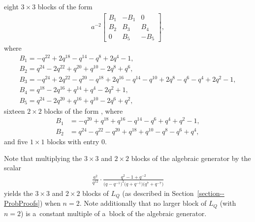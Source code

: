 \documentclass[10pt,a4paper]{amsart}
\numberwithin{equation}{section}
\theoremstyle{definition}
\newcommand{\flac}[2]{#1}
\begin{document}
eight $3 \times 3$ blocks of the form
\begin{align*}
 a^{-2} \begin{bmatrix}
 B_1 & -B_1 & 0 \\
 B_2 & B_3 & B_4 \\
 0 & B_5 & -B_5
 \end{bmatrix},
\end{align*}
where
\begin{gather*}
 B_1 = -\flac{q^{22}}{a^2}+\flac{2q^{18}}{a^2}-\flac{q^{14}}{a^2}-\flac{q^{8}}{a^2}+\flac{2q^{4}}{a^2}-\flac{1}{a^2}, \\
 B_2 = \flac{q^{24}}{a^2}-\flac{2q^{22}}{a^2}+\flac{q^{20}}{a^2}+\flac{q^{10}}{a^2}-\flac{2q^{8}}{a^2}+\flac{q^{6}}{a^2}, \\
 B_3 = -\flac{q^{24}}{a^2}+\flac{2q^{22}}{a^2}-\flac{q^{20}}{a^2}-\flac{q^{18}}{a^2}+\flac{2q^{16}}{a^2}-\flac{q^{14}}{a^2}-\flac{q^{10}}{a^2}+\flac{2q^{8}}{a^2}-\flac{q^{6}}{a^2}-\flac{q^{4}}{a^2}+\flac{2q^{2}}{a^2}-\flac{1}{a^2}, \\
 B_4 = \flac{q^{18}}{a^2}-\flac{2q^{16}}{a^2}+\flac{q^{14}}{a^2}+\flac{q^{4}}{a^2}-\flac{2q^{2}}{a^2}+\flac{1}{a^2}, \\
 B_5 = \flac{q^{24}}{a^2}-\flac{2q^{20}}{a^2}+\flac{q^{16}}{a^2}+\flac{q^{10}}{a^2}-\flac{2q^{6}}{a^2}+\flac{q^{2}}{a^2},
\end{gather*}
sixteen $2 \times 2$ blocks of the form
,
where
\begin{align*}
 B_1 &= -\flac{q^{20}}{a^2}+\flac{q^{18}}{a^2}+\flac{q^{16}}{a^2}-\flac{q^{14}}{a^2}-\flac{q^{6}}{a^2}+\flac{q^{4}}{a^2}+\flac{q^{2}}{a^2}-\flac{1}{a^2}, \\
 B_2 &= \flac{q^{24}}{a^2}-\flac{q^{22}}{a^2}-\flac{q^{20}}{a^2}+\flac{q^{18}}{a^2}+\flac{q^{10}}{a^2}-\flac{q^{8}}{a^2}-\flac{q^{6}}{a^2}+\flac{q^{4}}{a^2},
\end{align*}
and five $1 \times 1$ blocks with entry $0$.

Note that multiplying the $3 \times 3$ and $2 \times 2$ blocks of the algebraic generator by the scalar
\begin{align*}
 \frac{a^2}{q^{12}} \cdot \frac{q^2-1+q^{-2}}{\bigl(q-q^{-1}\bigr)^2 \bigl(q+q^{-1}\bigr) \bigl(q^7+q^{-7}\bigr)}
\end{align*}
yields the $3 \times 3$ and $2 \times 2$ blocks of $L_Q$ (as described in Section~\ref{section--ProbProofs}) when $n=2$. Note additionally that no larger block of $L_Q$ (with $n=2$) is a~constant multiple of a~block of the algebraic generator.
\end{document}
